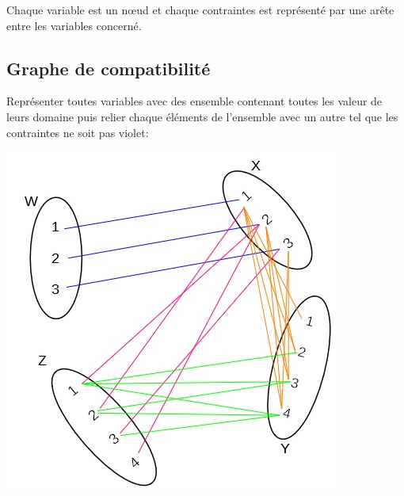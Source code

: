 Chaque variable est un nœud et chaque contraintes est représenté par une arête entre les variables concerné.\\
\begin{center}
\end{center}
\subsection{Graphe de compatibilité}

Représenter toutes variables avec des ensemble contenant toutes les valeur de leurs domaine puis relier chaque éléments de l'ensemble avec un autre tel que les contraintes ne soit pas violet:\\
\begin{center}
\includegraphics[scale=0.6]{img/aic_csp_1.jpg} 
\end{center}

